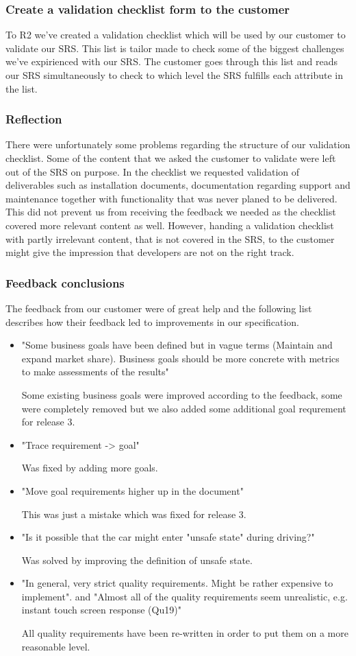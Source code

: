 \documentclass[10pt]{article}
\begin{document}
\subsubsection{Create a validation checklist form to the customer}
To R2 we've created a validation checklist which will be used by our customer to validate our SRS. This list is tailor made to check some of the biggest challenges we've expirienced with our SRS. The customer goes through this list and reads our SRS simultaneously to check to which level the SRS fulfills each attribute in the list.

\subsubsection{Reflection}
There were unfortunately some problems regarding the structure of our validation checklist. Some of the content that we asked the customer to validate were left out of the SRS on purpose. In the checklist we requested validation of deliverables such as installation documents, documentation regarding support and maintenance together with functionality that was never planed to be delivered.
This did not prevent us from receiving the feedback we needed as the checklist covered more relevant content as well. However, handing a validation checklist with partly irrelevant content, that is not covered in the SRS, to the customer might give the impression that developers are not on the right track. 
\subsubsection{Feedback conclusions}
The feedback from our customer were of great help and the following list describes how their feedback led to improvements in our specification.
\begin{itemize}
\item "Some business goals have been defined but in vague terms (Maintain and expand market share). Business goals should be more concrete with metrics to make assessments of the results"

Some existing business goals were improved according to the feedback, some were completely removed but we also added some additional goal requrement for release 3.
\item "Trace requirement -> goal" 

Was fixed by adding more goals.
\item "Move goal requirements higher up in the document" 

This was just a mistake which was fixed for release 3.
\item "Is it possible that the car might enter "unsafe state" during driving?" 

Was solved by improving the definition of unsafe state.
\item "In general, very strict quality requirements. Might be rather expensive to implement". and "Almost all of the quality requirements seem unrealistic, e.g. instant touch screen response (Qu19)"

All quality requirements have been re-written in order to put them on a more reasonable level.
\end{itemize}
\end{document}
